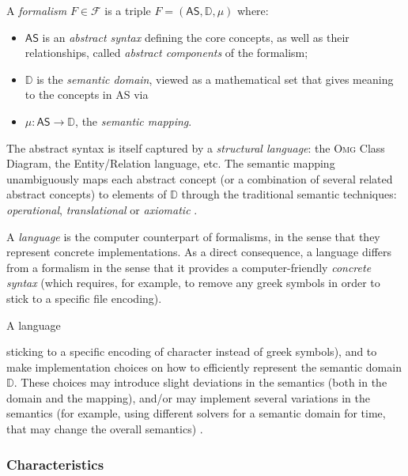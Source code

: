 \begin{definition}[Formalism]
   A \emph{formalism} $F \in \mathcal{F}$ is a triple $F = (\mathsf{AS}, \mathbb{D}, \mu)$ 
	where: 
	\begin{itemize}
		\item $\mathsf{AS}$ is an \emph{abstract syntax} defining the core concepts, as 
		well as their relationships, called \emph{abstract components} of the 
		formalism;
		
		\item $\mathbb{D}$ is the \emph{semantic domain}, viewed as a mathematical set that 
		gives meaning to the concepts in \textsf{AS} via
		
		\item $\mu \colon \mathsf{AS} \to \mathbb{D}$, the \emph{semantic mapping}.
	\end{itemize}
\end{definition}
The abstract syntax is itself captured by a \emph{structural language}: the 
\textsc{Omg} Class Diagram, the Entity/Relation language, etc. The semantic mapping
unambiguously maps each abstract concept (or a combination of several related 
abstract concepts) to elements of $\mathbb{D}$ through the traditional semantic 
techniques: \emph{operational}, \emph{translational} or \emph{axiomatic} 
\cite{}. 



A \emph{language} is the computer counterpart of formalisms, in the sense that 
they represent concrete implementations. As a direct consequence, a language differs
from a formalism in the sense that it provides a computer-friendly 
\emph{concrete syntax} (which requires, for example, to remove any greek symbols 
in order to stick to a specific file encoding). 

A language 


sticking to a specific encoding of character instead of greek symbols), and to make
implementation choices on how to efficiently represent the semantic domain 
$\mathbb{D}$. These choices may introduce slight deviations in the semantics 
(both in the domain and the mapping), and/or may implement several variations in 
the semantics (for example, using different solvers for a semantic domain for time, 
that may change the overall semantics) \cite{BromanViewpointsformalismslanguages2012}.




\subsubsection{Characteristics}
\label{sec:Formalism-Characteristics}


